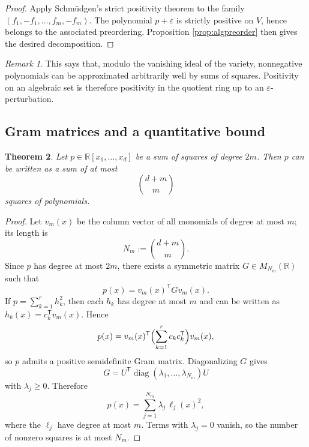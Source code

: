 \documentclass[11pt]{amsart}
\numberwithin{equation}{section}
\newtheorem{theorem}{Theorem}[section]
\theoremstyle{definition}
\theoremstyle{remark}
\newtheorem{remark}[theorem]{Remark}
\newcommand{\R}{\mathbb{R}}
\newcommand{\Rxd}{\R[x_1,\dots,x_d]}
\newcommand{\diag}{\operatorname{diag}}
\newcommand{\eps}{\varepsilon}
\newcommand{\1}{\mathbf{1}}
\begin{document}
\begin{proof}
Apply Schm\"udgen's strict positivity theorem to the family \((f_1,-f_1,\dots,f_m,-f_m)\). The polynomial \(p+\eps\) is strictly positive on \(V\), hence belongs to the associated preordering. Proposition \ref{prop:algpreorder} then gives the desired decomposition.
\end{proof}

\begin{remark}
This says that, modulo the vanishing ideal of the variety, nonnegative polynomials can be approximated arbitrarily well by sums of squares. Positivity on an algebraic set is therefore positivity in the quotient ring up to an \(\eps\)-perturbation.
\end{remark}

\subsection{Gram matrices and a quantitative bound}

\begin{theorem}\label{thm:grambound}
Let \(p\in\Rxd\) be a sum of squares of degree \(2m\). Then \(p\) can be written as a sum of at most
\[
\binom{d+m}{m}
\]
squares of polynomials.
\end{theorem}

\begin{proof}
Let \(v_m(x)\) be the column vector of all monomials of degree at most \(m\); its length is
\[
N_m:=\binom{d+m}{m}.
\]
Since \(p\) has degree at most \(2m\), there exists a symmetric matrix \(G\in M_{N_m}(\R)\) such that
\[
p(x)=v_m(x)^{\mathsf T}Gv_m(x).
\]
If \(p=\sum_{k=1}^r h_k^2\), then each \(h_k\) has degree at most \(m\) and can be written as \(h_k(x)=c_k^{\mathsf T}v_m(x)\). Hence
\[
p(x)=v_m(x)^{\mathsf T}\Bigl(\sum_{k=1}^r c_kc_k^{\mathsf T}\Bigr)v_m(x),
\]
so \(p\) admits a positive semidefinite Gram matrix. Diagonalizing \(G\) gives
\[
G=U^{\mathsf T}\diag(\lambda_1,\dots,\lambda_{N_m})U
\]
with \(\lambda_j\ge 0\). Therefore
\[
p(x)=\sum_{j=1}^{N_m}\lambda_j\,\ell_j(x)^2,
\]
where the \(\ell_j\) have degree at most \(m\). Terms with \(\lambda_j=0\) vanish, so the number of nonzero squares is at most \(N_m\).
\end{proof}
\end{document}
